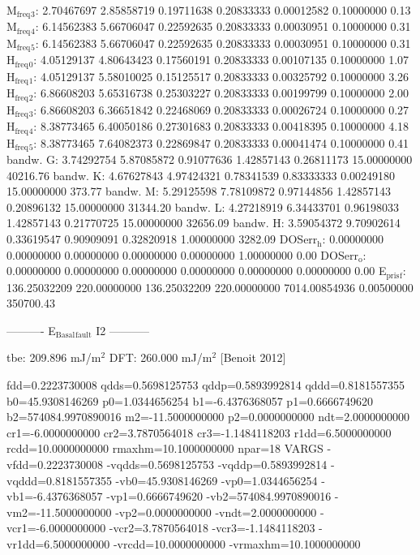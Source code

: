 \documentclass[11pt]{article}
\begin{document}
M\(_{\text{freq}}\)\(_{\text{3}}\):   2.70467697   2.85858719   0.19711638   0.20833333   0.00012582   0.10000000         0.13
M\(_{\text{freq}}\)\(_{\text{4}}\):   6.14562383   5.66706047   0.22592635   0.20833333   0.00030951   0.10000000         0.31
M\(_{\text{freq}}\)\(_{\text{5}}\):   6.14562383   5.66706047   0.22592635   0.20833333   0.00030951   0.10000000         0.31
H\(_{\text{freq}}\)\(_{\text{0}}\):   4.05129137   4.80643423   0.17560191   0.20833333   0.00107135   0.10000000         1.07
H\(_{\text{freq}}\)\(_{\text{1}}\):   4.05129137   5.58010025   0.15125517   0.20833333   0.00325792   0.10000000         3.26
H\(_{\text{freq}}\)\(_{\text{2}}\):   6.86608203   5.65316738   0.25303227   0.20833333   0.00199799   0.10000000         2.00
H\(_{\text{freq}}\)\(_{\text{3}}\):   6.86608203   6.36651842   0.22468069   0.20833333   0.00026724   0.10000000         0.27
H\(_{\text{freq}}\)\(_{\text{4}}\):   8.38773465   6.40050186   0.27301683   0.20833333   0.00418395   0.10000000         4.18
H\(_{\text{freq}}\)\(_{\text{5}}\):   8.38773465   7.64082373   0.22869847   0.20833333   0.00041474   0.10000000         0.41
bandw. G:   3.74292754   5.87085872   0.91077636   1.42857143   0.26811173  15.00000000     40216.76
bandw. K:   4.67627843   4.97424321   0.78341539   0.83333333   0.00249180  15.00000000       373.77
bandw. M:   5.29125598   7.78109872   0.97144856   1.42857143   0.20896132  15.00000000     31344.20
bandw. L:   4.27218919   6.34433701   0.96198033   1.42857143   0.21770725  15.00000000     32656.09
bandw. H:   3.59054372   9.70902614   0.33619547   0.90909091   0.32820918   1.00000000      3282.09
DOSerr\(_{\text{h}}\):   0.00000000   0.00000000   0.00000000   0.00000000   0.00000000   1.00000000         0.00
DOSerr\(_{\text{o}}\):   0.00000000   0.00000000   0.00000000   0.00000000   0.00000000   0.00000000         0.00
E\(_{\text{pris}}\)\(_{\text{f}}\): 136.25032209 220.00000000 136.25032209 220.00000000 7014.00854936   0.00500000    350700.43

----------     E\(_{\text{Basal}}\)\(_{\text{fault}}\) I2     -----------

tbe:       209.896 mJ/m\(^{\text{2}}\)
DFT:       260.000 mJ/m\(^{\text{2}}\) [Benoit  2012]




  fdd=0.2223730008 qdds=0.5698125753 qddp=0.5893992814 qddd=0.8181557355 b0=45.9308146269 p0=1.0344656254 b1=-6.4376368057 p1=0.6666749620 b2=574084.9970890016 m2=-11.5000000000 p2=0.0000000000 ndt=2.0000000000 cr1=-6.0000000000 cr2=3.7870564018 cr3=-1.1484118203 r1dd=6.5000000000 rcdd=10.0000000000 rmaxhm=10.1000000000 npar=18 
VARGS
    -vfdd=0.2223730008 -vqdds=0.5698125753 -vqddp=0.5893992814 -vqddd=0.8181557355 -vb0=45.9308146269 -vp0=1.0344656254 -vb1=-6.4376368057 -vp1=0.6666749620 -vb2=574084.9970890016 -vm2=-11.5000000000 -vp2=0.0000000000 -vndt=2.0000000000 -vcr1=-6.0000000000 -vcr2=3.7870564018 -vcr3=-1.1484118203 -vr1dd=6.5000000000 -vrcdd=10.0000000000 -vrmaxhm=10.1000000000 
\end{document}
